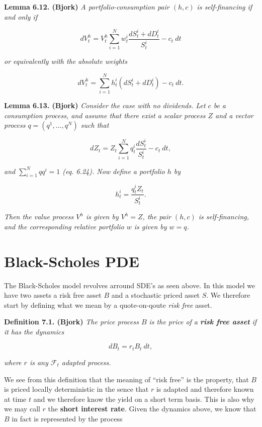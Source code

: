 \documentclass[a4paper,12pt,openany]{book}
\begin{document}
\textbf{Lemma 6.12. (Bjork)} \emph{A portfolio-consumption pair \((h,c)\) is self-financing if and only if}

\[
dV_t^h=V_t^h\sum_{i=1}^N w_t^i\frac{dS_t^i+dD_t^i}{S_t^i}-c_t\ dt\tag{6.22}
\]

\emph{or equivalently with the absolute weights}

\[
dV_t^h=\sum_{i=1}^N h_t^i(dS_t^i+dD_t^i)-c_t\ dt.
\]

\textbf{Lemma 6.13. (Bjork)} \emph{Consider the case with no dividends. Let \(c\) be a consumption process, and assume that there exist a scalar process \(Z\) and a vector process \(q=(q^1,...,q^N)\) such that}

\[
dZ_t=Z_t\sum_{i=1}^N q_t^i\frac{dS_t^i}{S_t^i}-c_t\ dt,\tag{6.23}
\]

\emph{and \(\sum_{i=1}^Nqq^i=1\) (eq. 6.24). Now define a portfolio \(h\) by}

\[
h_t^i=\frac{q_t^iZ_t}{S_t^i}.\tag{6.25}
\]

\emph{Then the value process \(V^h\) is given by \(V^h=Z\), the pair \((h,c)\) is self-financing, and the corresponding relative portfolio \(w\) is given by \(w=q\).}

\hypertarget{black-scholes-pde}{%
\section{Black-Scholes PDE}\label{black-scholes-pde}}

The Black-Scholes model revolves arround SDE's as seen above. In this model we have two assets a risk free asset \(B\) and a stochastic priced asset \(S\). We therefore start by defining what we mean by a quote-on-qoute \emph{risk free} asset.

\textbf{Definition 7.1. (Bjork)} \emph{The price process \(B\) is the price of a \textbf{risk free asset} if it has the dynamics}

\[
dB_t=r_t B_t\ dt,\tag{7.1}
\]

\emph{where \(r\) is any \(\mathcal{F}_t\) adapted process.}

We see from this definition that the meaning of ``risk free'' is the property, that \(B\) is priced locally deterministic in the sence that \(r\) is adapted and therefore known at time \(t\) and we therefore know the yield on a short term basis. This is also why we may call \(r\) the \textbf{short interest rate}. Given the dynamics above, we know that \(B\) in fact is represented by the process
\end{document}
